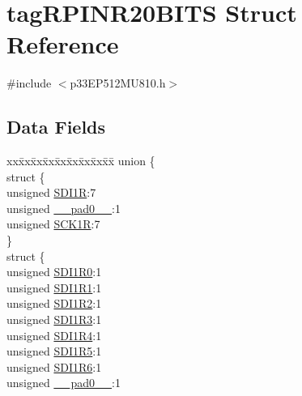 \hypertarget{structtag_r_p_i_n_r20_b_i_t_s}{}\section{tag\+R\+P\+I\+N\+R20\+B\+I\+TS Struct Reference}
\label{structtag_r_p_i_n_r20_b_i_t_s}


{\ttfamily \#include $<$p33\+E\+P512\+M\+U810.\+h$>$}

\subsection*{Data Fields}
\begin{DoxyCompactItemize}
\item 
\begin{tabbing}
xx\=xx\=xx\=xx\=xx\=xx\=xx\=xx\=xx\=\kill
union \{\\
\>struct \{\\
\>\>unsigned \hyperlink{structtag_r_p_i_n_r20_b_i_t_s_a66e4775b334e5e390c1a76285adfd119}{SDI1R}:7\\
\>\>unsigned \hyperlink{structtag_r_p_i_n_r20_b_i_t_s_adf71f3d8410c1f1dbbc96680a92c49af}{\_\_pad0\_\_}:1\\
\>\>unsigned \hyperlink{structtag_r_p_i_n_r20_b_i_t_s_a3e70f180c9869c58688fec36c204c238}{SCK1R}:7\\
\>\} \\
\>struct \{\\
\>\>unsigned \hyperlink{structtag_r_p_i_n_r20_b_i_t_s_a1ea2fba37574a14cc02f257cd5940f9e}{SDI1R0}:1\\
\>\>unsigned \hyperlink{structtag_r_p_i_n_r20_b_i_t_s_a3dad60b9d0734a7c264846352eadb603}{SDI1R1}:1\\
\>\>unsigned \hyperlink{structtag_r_p_i_n_r20_b_i_t_s_aa0a77b3f13a04163f96c42cddb77eded}{SDI1R2}:1\\
\>\>unsigned \hyperlink{structtag_r_p_i_n_r20_b_i_t_s_ac4a2af30e05c5495f59ad21e059c28d2}{SDI1R3}:1\\
\>\>unsigned \hyperlink{structtag_r_p_i_n_r20_b_i_t_s_a3a648b20b8a6a76e52b8799f9a2ac196}{SDI1R4}:1\\
\>\>unsigned \hyperlink{structtag_r_p_i_n_r20_b_i_t_s_af67a18074110405c8f39195b156516fd}{SDI1R5}:1\\
\>\>unsigned \hyperlink{structtag_r_p_i_n_r20_b_i_t_s_afcd5c378977ecc407aee4d4d121dc8ce}{SDI1R6}:1\\
\>\>unsigned \hyperlink{structtag_r_p_i_n_r20_b_i_t_s_adf71f3d8410c1f1dbbc96680a92c49af}{\_\_pad0\_\_}:1\\

\end{tabbing}
\end{DoxyCompactItemize}
